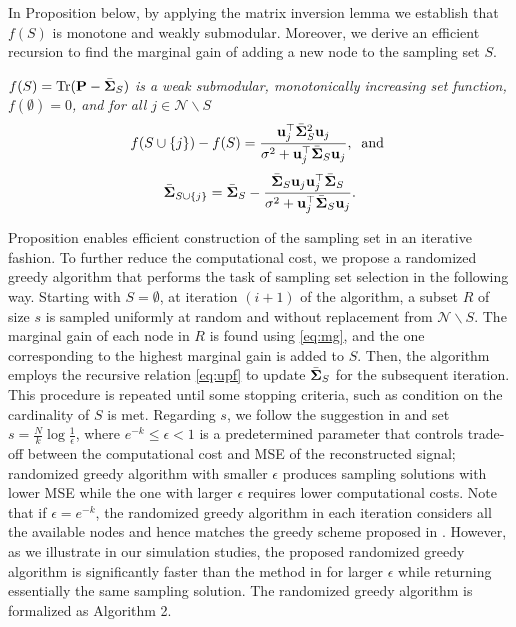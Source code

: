 In Proposition  below, by applying the matrix inversion lemma 
\cite{bellman1997introduction} we establish that $f(S)$ is monotone and weakly submodular. 
Moreover, we derive an efficient recursion to find the marginal gain of adding a new node 
to the sampling set $S$. 
%
\begin{proposition}\label{thm:p}
\textit{$f(S) = \mathrm{Tr}(\P-\bar{\S}_S)$ is a weak submodular, monotonically increasing set function, $f(\emptyset)=0$, and for all $j \in \mathcal{N}\backslash S$
%
\begin{equation}\label{eq:mg}
f(S\cup \{j\})-f(S) = \frac{\u_j^\top\bar{\S}_S^{2}\u_j}{\sigma^{2}+\u_j^\top\bar{\S}_S\u_j},\: \text{ and }
\end{equation}
%
\begin{equation}\label{eq:upf}
\bar{\S}_{S \cup\{j\}} = \bar{\S}_S-\frac{\bar{\S}_{S}\u_{j}\u_{j}^\top\bar{\S}_{S}}{\sigma^2+\u_{j}^\top\bar{\S}_{S}\u_{j}}.
\end{equation}}
%
\end{proposition}
%
Proposition  enables efficient construction of the sampling set in an iterative fashion. To further reduce the computational cost, we propose a randomized greedy algorithm that performs the task of sampling set selection in the following way.  Starting with $S = \emptyset$, at iteration $(i+1)$ of the algorithm, a subset $R$ of size $s$ is sampled uniformly at random and without replacement from $\mathcal{N} \backslash S$. 
The marginal gain of each node in $R$ is found using \ref{eq:mg}, and the one corresponding to the highest marginal gain is added to $S$. Then, the algorithm employs the recursive relation \ref{eq:upf} to update $\bar{\S}_S$ for the subsequent iteration. This procedure is repeated until some stopping criteria, such as condition on the cardinality of $S$ is met. Regarding $s$, we follow the suggestion in \cite{mirzasoleiman2014lazier} and set $s=\frac{N}{k}\log\frac{1}{\epsilon}$, where $e^{-k}\leq \epsilon<1$ is a predetermined parameter that controls trade-off between the computational cost and MSE of the reconstructed signal; randomized greedy algorithm with smaller $\epsilon$ produces sampling solutions with lower MSE while the one with larger $\epsilon$ requires lower computational costs. Note that if $\epsilon = e^{-k}$, the randomized greedy algorithm in each iteration considers all the available nodes and hence  matches the greedy scheme proposed in \cite{chamon2017greedy}. However, as we illustrate in our simulation studies, the proposed randomized greedy algorithm is significantly faster than the method in \cite{chamon2017greedy} for larger $\epsilon$ while returning essentially the same sampling solution. The randomized greedy algorithm is formalized as Algorithm 2.

